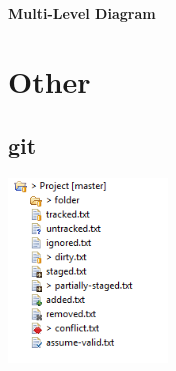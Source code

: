 \documentclass{scrreprt}
\makeatletter
\newcounter{myCounter}[subsubsection]
\newcommand{\specLabel}[1]{%
\myLabel{#1}{Spec}}
\newcommand{\layerOne}[1]{\chapter{#1}}
\newcommand{\layerTwo}[1]{\section{#1}}
\newcommand{\layerThree}[1]{\subsection{#1}}
\newcommand{\layerFour}[1]{\subsubsection{#1}}
\newcommand{\myLabel}[2]{%
		\refstepcounter{myCounter}
		\def\@currentlabel{#2-\thesubsubsection.\arabic{myCounter}}%
		\raisebox{\f@size pt}\phantomsection
		\label{req:#1}
		#2-\thesubsubsection.\arabic{myCounter}}
\newcommand{\myRef}[1]{
  \ref{req:#1}}
\makeatother
\begin{document}
\layerFour{Multi-Level Diagram}

%
%


\layerOne{Other}

\layerTwo{git}

\includegraphics[width=120pt]{img/git-IconDecorations.png} %
\end{document}
